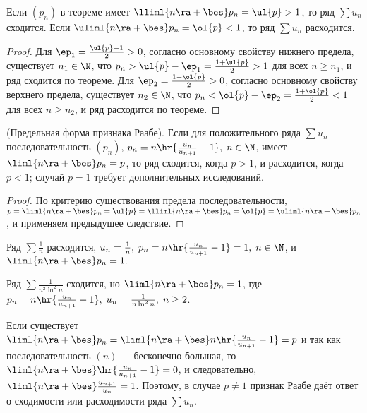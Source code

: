 \documentclass[a4paper]{article}
\begin{document}
\begin{imp}
Если $(p_n)$ в теореме имеет $\lliml{n\ra+\bes} p_n = \ul{p}>1$, то
ряд $\sum u_n$ сходится. Если $\uliml{n\ra+\bes}p_n = \ol{p} < 1$,
то ряд $\sum u_n$ расходится.
\end{imp}

\begin{proof}
Для $\ep_1 = \frac{\ul{p}-1}2 > 0$, согласно основному свойству
нижнего предела, существует $n_1\in\N$, что $p_n > \ul{p} - \ep_1 =
\frac{1+\ul{p}}2 > 1$ для всех $n\ge n_1$, и ряд сходится по
теореме. Для $\ep_2 = \frac{1-\ol{p}}2>0$, согласно основному
свойству верхнего предела, существует $n_2\in\N$, что $p_n < \ol{p}
+ \ep_2 = \frac{1+\ol{p}}2 < 1$ для всех $n\ge n_2$, и ряд
расходится по теореме.
\end{proof}

\begin{imp}
(Предельная форма признака Раабе). Если для положительного ряда
$\sum u_n$ последовательность $(p_n)$,
$p_n=n\hr{\frac{u_n}{u_{n+1}}-1}, \; n\in\N$, имеет
$\liml{n\ra+\bes} p_n = p$, то ряд сходится, когда $p>1$, и
расходится, когда $p<1$; случай $p=1$ требует дополнительных
исследований.
\end{imp}

\begin{proof}
По критерию существования предела последовательности,
$p=\liml{n\ra+\bes}p_n = \ul{p} = \lliml{n\ra+\bes}p_n = \ol{p} =
\uliml{n\ra+\bes}p_n$, и применяем предыдущее следствие.
\end{proof}

\begin{ex}
Ряд $\sum\frac1n$ расходится, $u_n=\frac1n, \; p_n =
n\hr{\frac{u_n}{u_{n+1}}-1}=1, \; n\in\N$, и $\liml{n\ra+\bes}p_n =
1.$
\end{ex}

\begin{ex}
Ряд $\sum \frac1{n^2\ln^2n}$ сходится, но $\liml{n\ra+\bes}p_n=1$,
где $p_n = n\hr{\frac{u_n}{u_{n+1}}-1}, \; u_n = \frac1{n\ln^2n}, \;
n\ge2$.
\end{ex}

\begin{note}
Если существует $\liml{n\ra+\bes}p_n = \liml{n\ra+\bes}
n\hr{\frac{u_n}{u_{n+1}}-1}=p$ и так как последовательность $(n)$
--- бесконечно большая, то $\liml{n\ra+\bes}
\hr{\frac{u_n}{u_{n+1}}-1}=0$, и следовательно, $\liml{n\ra+\bes}
\frac{u_{n+1}}{u_n} = 1$. Поэтому, в случае $p\ne1$ признак Раабе
даёт ответ о сходимости или расходимости ряда $\sum u_n$.
\end{note}
\end{document}
